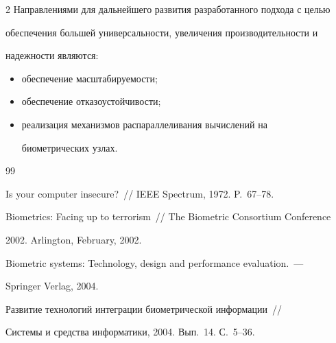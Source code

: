 \begin{multicols}{2}
  Направлениями для дальнейшего развития разработанного подхода с целью 

обеспечения большей универсальности, увеличения производительности и 

надежности являются:

  \begin{itemize}

\item обеспечение масштабируемости;

\item обеспечение отказоустойчивости;

\item реализация механизмов распараллеливания вычислений на 

биометрических узлах.

\end{itemize}

  

{\small\frenchspacing

{%


\begin{thebibliography}{99}

  



Is your computer insecure?~// IEEE Spectrum, 1972. P.~67--78.





Biometrics: Facing up to terrorism~// The Biometric Consortium Conference 

2002.  Arlington, February, 2002.





Biometric systems: Technology, design and performance evaluation.~--- 

Springer Verlag, 2004.





Развитие технологий интеграции биометрической информации~// 

Системы и средства информатики, 2004. Вып.~14. С.~5--36.




\end{thebibliography}}}
\end{multicols}
